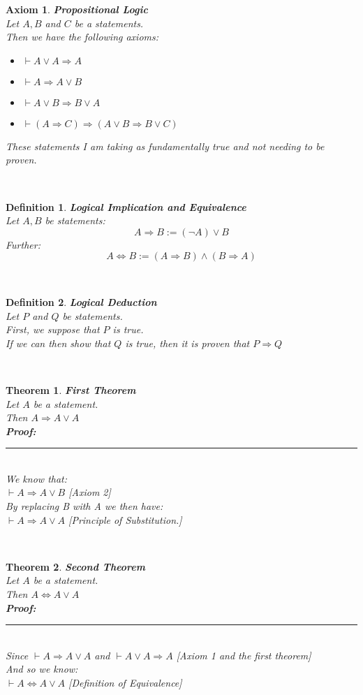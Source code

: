\documentclass[12pt]{extarticle}
\theoremstyle{plain}
\newtheorem{thm}{Theorem}[section]
\theoremstyle{plain}
\newtheorem{axiom}{Axiom}[section]
\theoremstyle{plain}
\theoremstyle{Definition}
\newtheorem{def.}{Definition}[section]
\theoremstyle{Definition}
\theoremstyle{plain}
\newcommand{\cut}[0]{\noindent\framebox[\linewidth]{\rule{\linewidth}{2pt}}\\}
\newcommand{\prof}[0]{	\noindent \textbf{Proof:} \rule{500pt}{2pt} \\ }
\begin{document}
\begin{axiom} \textbf{Propositional Logic} \\ 
	Let $A,B$ and $C$ be a statements.\\
	Then we have the following axioms: 
	\begin{itemize}
		\item $\vdash A \lor A \Rightarrow A$ 
		\item $\vdash A \Rightarrow A \lor B$ 
		\item $\vdash A \lor B \Rightarrow B \lor A$ 
		\item $\vdash (A \Rightarrow C) \Rightarrow ( A \lor B \Rightarrow B \lor C ) $
	\end{itemize}
	These statements I am taking as fundamentally true and not needing to be proven. 
\end{axiom}
\cut
\begin{def.} \textbf{Logical Implication and Equivalence} \\
	Let $A,B$ be statements: 
	$$A \Rightarrow B := (\lnot A) \lor B$$
	Further: 
	$$A \Leftrightarrow B := (A \Rightarrow B) \wedge (B \Rightarrow A)$$
\end{def.}
\cut
\begin{def.} \textbf{Logical Deduction} \\
	Let $P$ and $Q$ be statements. \\ 
	First, we suppose that $P$ is true. \\
	If we can then show that $Q$ is true, then it is proven that $P \Rightarrow Q$
\end{def.}
\cut
\begin{thm} \textbf{First Theorem} \\ 
	Let $A$ be a statement. \\ 
	Then $A \Rightarrow A \lor A $ \\ 
	\prof
	We know that: \\ 
	$\vdash A \Rightarrow A \lor B$ \hfill [Axiom 2]\\ 
	By replacing B with A we then have: \\ 
	$\vdash A \Rightarrow A \lor A$ \hfill [Principle of Substitution.] 
\end{thm}
\cut
\begin{thm} \textbf{Second Theorem} \\
	Let $A$ be a statement. \\ 
	Then $A \Leftrightarrow A \lor A $ \\ 	
	\prof
	Since $\vdash A \Rightarrow A \lor A$ and $\vdash A \lor A \Rightarrow A$ \hfill [Axiom 1 and the first theorem]\\
	And so we know: \\
	$\vdash A \Leftrightarrow A \lor A$ \hfill [Definition of Equivalence]
\end{thm}
\end{document}
